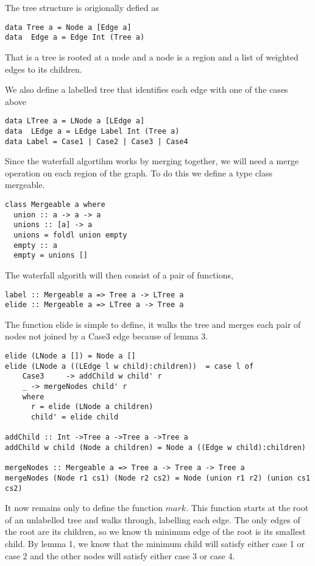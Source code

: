 \documentclass{jfp}
\begin{document}
The tree structure is origionally defied as

\begin{verbatim}
data Tree a = Node a [Edge a]
data  Edge a = Edge Int (Tree a)
\end{verbatim}

That is a tree is rooted at a node and a node is a region and a list of weighted edges to its children.

We also define a labelled tree that identifies each edge with one of the cases above

\begin{verbatim}
data LTree a = LNode a [LEdge a]
data  LEdge a = LEdge Label Int (Tree a)
data Label = Case1 | Case2 | Case3 | Case4
\end{verbatim}

Since the waterfall algortihm works by merging together, we will need a merge operation on each region of the graph. To do this we define a type class mergeable.

\begin{verbatim}
class Mergeable a where
  union :: a -> a -> a
  unions :: [a] -> a
  unions = foldl union empty
  empty :: a
  empty = unions []
\end{verbatim}

The waterfall algorith will then consist of a pair of functions,

\begin{verbatim}
label :: Mergeable a => Tree a -> LTree a
elide :: Mergeable a => LTree a -> Tree a
\end{verbatim}

The function elide is simple to define, it walks the tree and merges each pair of nodes not joined by a Case3 edge because of lemma 3.

\begin{verbatim}
elide (LNode a []) = Node a []
elide (LNode a ((LEdge l w child):children))  = case l of
    Case3     -> addChild w child' r
    _ -> mergeNodes child' r
    where
      r = elide (LNode a children)
      child' = elide child

addChild :: Int ->Tree a ->Tree a ->Tree a
addChild w child (Node a children) = Node a ((Edge w child):children)

mergeNodes :: Mergeable a => Tree a -> Tree a -> Tree a
mergeNodes (Node r1 cs1) (Node r2 cs2) = Node (union r1 r2) (union cs1 cs2)

\end{verbatim}

It now remains only to define the function $mark$. This function starts at the root of an unlabelled tree and walks through, labelling each edge. The only edges of the root are its children, so we know th minimum edge of the root is its smallest child. By lemma 1, we know that the minimum child will satisfy either case 1 or case 2 and the other nodes will satisfy either case 3 or case 4.
\end{document}
